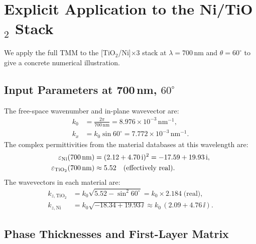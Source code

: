 \section{Explicit Application to the Ni/TiO\texorpdfstring{$_2$}{2} Stack}

We apply the full TMM to the [TiO$_2$/Ni]$\times$3 stack at $\lambda = 700$\,nm
and $\theta = 60^\circ$ to give a concrete numerical illustration.

\subsection{Input Parameters at 700\,nm, $60^\circ$}

The free-space wavenumber and in-plane wavevector are:
\begin{align}
  k_0 &= \frac{2\pi}{700\,\text{nm}} = 8.976 \times 10^{-3}\,\text{nm}^{-1}, \\
  k_x &= k_0\sin 60^\circ = 7.772 \times 10^{-3}\,\text{nm}^{-1}.
  \label{eq:ch5_kxk0}
\end{align}
The complex permittivities from the material databases at this wavelength are:
\begin{align}
  \varepsilon_{\mathrm{Ni}}(700\,\text{nm})
    &= (2.12 + 4.70\,\mathrm{i})^2 = -17.59 + 19.93\,\mathrm{i}, \\
  \varepsilon_{\mathrm{TiO_2}}(700\,\text{nm})
    &\approx 5.52\quad\text{(effectively real)}.
  \label{eq:ch5_epsilons}
\end{align}
The wavevectors in each material are:
\begin{align}
  k_{z,\mathrm{TiO_2}} &= k_0\sqrt{5.52 - \sin^2 60^\circ}
                         = k_0 \times 2.184\;\text{(real)},
  \label{eq:ch5_kz_TiO2} \\
  k_{z,\mathrm{Ni}} &= k_0\sqrt{-18.34 + 19.93\,\ii}
                      \approx k_0\,(2.09 + 4.76\,\ii).
  \label{eq:ch5_kz_Ni}
\end{align}

\subsection{Phase Thicknesses and First-Layer Matrix}

